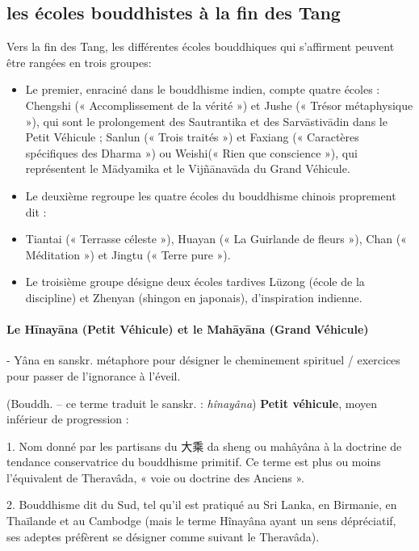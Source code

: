 \subsection{les écoles bouddhistes à la fin des Tang}

Vers la fin des Tang, les différentes écoles bouddhiques qui s’affirment peuvent être rangées en trois groupes:
\begin{itemize}
    \item Le premier, enraciné dans le bouddhisme indien, compte quatre écoles : Chengshi (« Accomplissement de la vérité ») et Jushe (« Trésor métaphysique »), qui sont le prolongement des Sautrantika et des Sarvāstivādin dans le Petit Véhicule ; Sanlun (« Trois traités ») et Faxiang (« Caractères spécifiques des Dharma ») ou Weishi(« Rien que conscience »), qui représentent le Mādyamika et le Vijñānavāda du Grand Véhicule.
    \item Le deuxième regroupe les quatre écoles du bouddhisme chinois proprement dit :
    \item Tiantai (« Terrasse céleste »), Huayan (« La Guirlande de fleurs »), Chan (« Méditation ») et Jingtu (« Terre pure »).
    \item Le troisième groupe désigne deux écoles tardives Lüzong (école de la discipline) et Zhenyan (shingon en japonais), d’inspiration indienne.
\end{itemize}


\paragraph{Le Hīnayāna (Petit Véhicule) et le Mahāyāna (Grand Véhicule)}

\begin{Def}[véhicule ] - Yâna en sanskr.
    métaphore pour désigner le cheminement spirituel / exercices pour passer de l'ignorance à l'éveil.
\end{Def}




\begin{Def}[xiaosheng 小乘]
    (Bouddh. – ce terme traduit le sanskr. : \textit{hînayâna}) \textbf{Petit véhicule}, moyen inférieur de progression :	
    
    1. Nom donné par les partisans du 大乘 da sheng ou mahâyâna à la doctrine de tendance conservatrice du bouddhisme primitif. Ce terme est plus ou moins l’équivalent de Theravâda, « voie ou doctrine des Anciens ». 
    
    2. Bouddhisme dit du Sud, tel qu’il est pratiqué au Sri Lanka, en Birmanie, en Thaïlande et au Cambodge (mais le terme Hînayâna ayant un sens dépréciatif, ses adeptes préfèrent se désigner comme suivant le Theravâda).
\end{Def}


